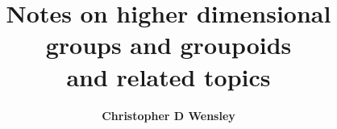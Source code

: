 \documentclass[11pt,a4paper]{article}
\begin{document}
  \title
  {\bf Notes on higher dimensional groups and groupoids \\
       and related topics}
    \author{{\bf Christopher D Wensley}}
  \maketitle

\tableofcontents

\newpage 

\newpage 

\newpage 

\newpage 

\newpage 

\newpage 

\newpage 

\newpage  


\newpage  


\newpage 

\newpage  

\newpage 

\newpage  


\newpage 

\newpage  

\newpage  

\newpage  

\newpage  

\newpage  

\printindex
\end{document}
